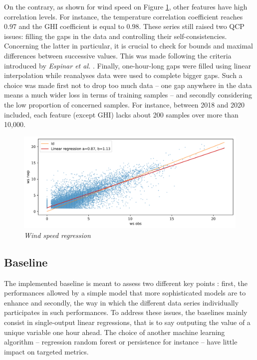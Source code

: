 \documentclass{article}
\newcommand{\saut}{\vspace{10px}}
\begin{document}
On the contrary, as shown for wind speed on Figure \ref{ws_straight}, other features have high correlation levels.
For instance, the temperature correlation coefficient reaches $0.97$ and the GHI coefficient is equal to $0.98$.
These series still raised two QCP issues: filling the gaps in the data and controlling their self-consistencies.
Concerning the latter in particular, it is crucial to check for bounds and
maximal differences between successive values.
This was made following the criteria introduced by \emph{Espinar et al.} \cite{espinar_quality_nodate}.
Finally, one-hour-long gaps were filled using linear interpolation while reanalyses data were used
to complete bigger gaps. Such a choice was made first not to drop too much data -- one gap anywhere in
the data means a much wider loss in terms of training samples -- and secondly considering the low proportion
of concerned samples. For instance, between 2018 and 2020 included, each feature (except GHI) lacks about
200 samples over more than 10,000.

\saut

\begin{figure}[H]
    \centering
    \includegraphics[width=\linewidth]{img/ws_compare.png}
    \caption{\textit{Wind speed regression}}
   \label{ws_straight}
\end{figure}

\subsection*{Baseline}

The implemented baseline is meant to assess two different key points : first, the performances allowed by a simple
model that more sophisticated models are to enhance and secondly, the way in which the different data
series individually participates in such performances.
To address these issues, the baselines mainly consist in single-output
linear regressions, that is to say outputing the value of a unique variable one hour ahead.
The choice of another machine learning algorithm -- regression random forest or persistence for instance -- have little
impact on targeted metrics.
\end{document}
